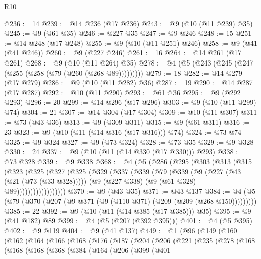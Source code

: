 \begin{lexlean}{R10}
\begin{coremodule}
{{{{{{{{{{{{{{{{{{{{{{{{{{{{{{{{{{{{{{{{{{{{{{{{{{{@236 := 14
@239 := @14 @236 (@17 @236)
@243 := @9 (@10 (@11 @239) @35)
@245 := @9 (@61 @35)
@246 := @227 @35
@247 := @9 @246
@248 := 15
@251 := @14 @248 (@17 @248)
@255 := @9 (@10 (@11 @251) @246)
@258 := @9 (@41 (@41 @246))
@260 := @9 (@227 @246)
@261 := 16
@264 := @14 @261 (@17 @261)
@268 := @9 (@10 (@11 @264) @35)
@278 := @4 (@5 (@243 (@245 (@247 (@255 (@258 (@79 (@260 (@268 @89)))))))))
@279 := 18
@282 := @14 @279 (@17 @279)
@286 := @9 (@10 (@11 @282) @36)
@287 := 19
@290 := @14 @287 (@17 @287)
@292 := @10 (@11 @290)
@293 := @61 @36
@295 := @9 (@292 @293)
@296 := 20
@299 := @14 @296 (@17 @296)
@303 := @9 (@10 (@11 @299) @74)
@304 := 21
@307 := @14 @304 (@17 @304)
@309 := @10 (@11 @307)
@311 := @73 (@43 @36)
@313 := @9 (@309 @311)
@315 := @9 (@61 @311)
@316 := 23
@323 := @9 (@10 (@11 (@14 @316 (@17 @316))) @74)
@324 := @73 @74
@325 := @9 @324
@327 := @9 (@73 @324)
@328 := @73 @35
@329 := @9 @328
@330 := 24
@337 := @9 (@10 (@11 (@14 @330 (@17 @330))) @293)
@338 := @73 @328
@339 := @9 @338
@368 := @4
    (@5
      (@286
        (@295
          (@303
            (@313
              (@315
                (@323
                  (@325
                    (@327
                      (@325
                        (@329
                          (@337
                            (@339
                              (@79
                                (@339
                                  (@9
                                    (@227 (@43 (@21 (@73 (@33 @328)))))
                                    (@9 (@227 @338) (@9 (@61 @328) @89))))))))))))))))))
@370 := @9 (@43 @35)
@371 := @43 @137
@384 := @4 (@5 (@79 (@370 (@207 (@9 @371 (@9 (@110 @371) (@209 (@209 (@268 @150)))))))))
@385 := 22
@392 := @9 (@10 (@11 (@14 @385 (@17 @385))) @35)
@395 := @9 (@41 @182) @89
@399 := @4 (@5 (@207 (@392 @395)))
@401 := @4 (@5 @395)
@402 := @9 @119
@404 := @9 (@41 @137)
@449 := @1
    (@96
      (@149
        (@160
          (@162
            (@164
              (@166
                (@168
                  (@176
                    (@187
                      (@204
                        (@206
                          (@221
                            (@235
                              (@278
                                (@168
                                  (@168
                                    (@168
                                      (@368
                                        (@384
                                          (@164
                                            (@206
                                              (@399
                                                (@401
}}}}}}}}}}}}}}}}}}}}}}}}}}}}}}}}}}}}}}}}}}}}}}}}}}}
\end{coremodule}
\end{lexlean}
